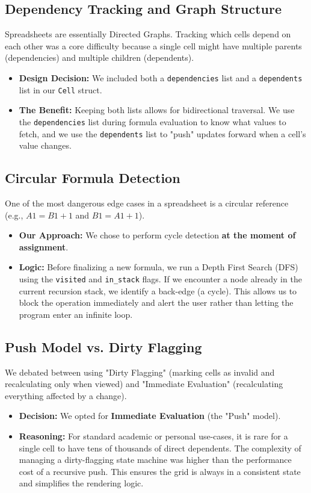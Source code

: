 \documentclass[twocolumn]{article}
\begin{document}
\subsection{Dependency Tracking and Graph Structure}
Spreadsheets are essentially Directed Graphs. Tracking which cells depend on each other was a core difficulty because a single cell might have multiple parents (dependencies) and multiple children (dependents).
\begin{itemize}
    \item \textbf{Design Decision:} We included both a \texttt{dependencies} list and a \texttt{dependents} list in our \texttt{Cell} struct. 
    \item \textbf{The Benefit:} Keeping both lists allows for bidirectional traversal. We use the \texttt{dependencies} list during formula evaluation to know what values to fetch, and we use the \texttt{dependents} list to "push" updates forward when a cell's value changes.
\end{itemize}

\subsection{Circular Formula Detection}
One of the most dangerous edge cases in a spreadsheet is a circular reference (e.g., $A1=B1+1$ and $B1=A1+1$). 
\begin{itemize}
    \item \textbf{Our Approach:} We chose to perform cycle detection \textbf{at the moment of assignment}. 
    \item \textbf{Logic:} Before finalizing a new formula, we run a Depth First Search (DFS) using the \texttt{visited} and \texttt{in\_stack} flags. If we encounter a node already in the current recursion stack, we identify a back-edge (a cycle). This allows us to block the operation immediately and alert the user rather than letting the program enter an infinite loop.
\end{itemize}

\subsection{Push Model vs. Dirty Flagging}
We debated between using "Dirty Flagging" (marking cells as invalid and recalculating only when viewed) and "Immediate Evaluation" (recalculating everything affected by a change).
\begin{itemize}
    \item \textbf{Decision:} We opted for \textbf{Immediate Evaluation} (the "Push" model). 
    \item \textbf{Reasoning:} For standard academic or personal use-cases, it is rare for a single cell to have tens of thousands of direct dependents. The complexity of managing a dirty-flagging state machine was higher than the performance cost of a recursive push. This ensures the grid is always in a consistent state and simplifies the rendering logic.
\end{itemize}
\end{document}
